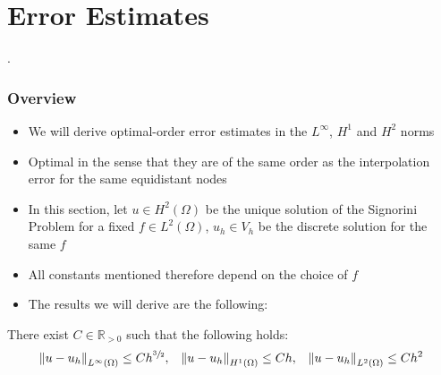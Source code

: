 \section{Error Estimates}
\PraesentationMasterWeissBlau
\begin{frame}
	\centering
	\vspace{6cm}
	\huge{\thesection . \secname}
\end{frame}
\PraesentationMasterStandard
\begin{frame}
	\frametitle{Overview}
	\begin{itemize}
		\item We will derive optimal-order error estimates in the $L^{\infty}$, $H^1$ and $H^2$ norms
		\item Optimal in the sense that they are of the same order as the interpolation error for the same equidistant nodes
		\item In this section, let $u \in H^2(\Omega)$ be the unique solution of the Signorini Problem for a fixed $f \in L^2(\Omega)$, $u_h \in V_h$ be the discrete solution for the same $f$
		\item All constants mentioned therefore depend on the choice of $f$
		\item The results we will derive are the following:
	\end{itemize}
	\begin{theorem}
		There exist $C \in \mathbb{R}_{>0}$ such that the following holds:
		\begin{equation}
			\norm{u-u_h}_{L^\infty(\Omega)} \leq C h^{\sfrac{3}{2}}, \quad \norm{u-u_h}_{H^1(\Omega)} \leq C h, \quad 	\norm{u-u_h}_{L^2(\Omega)} \leq Ch^2
		\end{equation}
	\end{theorem}
\end{frame}

